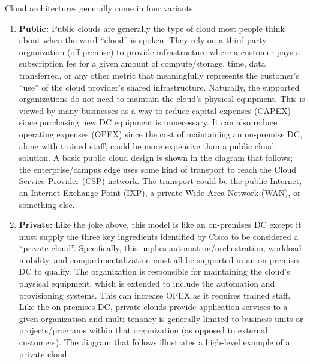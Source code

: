 Cloud architectures generally come in four variants:
\begin{enumerate}
  \item \textbf{Public:} Public clouds are generally the type of cloud most people think
  about when the word ``cloud'' is spoken. They rely on a third party organization
  (off-premise) to provide infrastructure where a customer pays a subscription
  fee for a given amount of compute/storage, time, data transferred, or any
  other metric that meaningfully represents the customer’s ``use'' of the cloud
  provider’s shared infrastructure. Naturally, the supported organizations do
  not need to maintain the cloud’s physical equipment. This is viewed by many
  businesses as a way to reduce capital expenses (CAPEX) since purchasing new
  DC equipment is unnecessary. It can also reduce operating expenses (OPEX)
  since the cost of maintaining an on-premise DC, along with trained staff,
  could be more expensive than a public cloud solution. A basic public cloud
  design is shown in the diagram that follows; the enterprise/campus edge uses some
  kind of transport to reach the Cloud Service Provider (CSP) network. The
  transport could be the public Internet, an Internet Exchange Point (IXP),
  a private Wide Area Network (WAN), or something else.


  \item \textbf{Private:} Like the joke above, this model is like an on-premises
  DC except it must supply the three key ingredients identified by Cisco to be
  considered a ``private cloud''. Specifically, this implies
  automation/orchestration, workload mobility, and compartmentalization must
  all be supported in an on-premises DC to qualify. The organization is
  responsible for maintaining the cloud’s physical equipment, which is
  extended to include the automation and provisioning systems. This can
  increase OPEX as it requires trained staff. Like the on-premises DC, private
  clouds provide application services to a given organization and
  multi-tenancy is generally limited to business units or projects/programs
  within that organization (as opposed to external customers). The diagram
  that follows illustrates a high-level example of a private cloud.



\end{enumerate}
